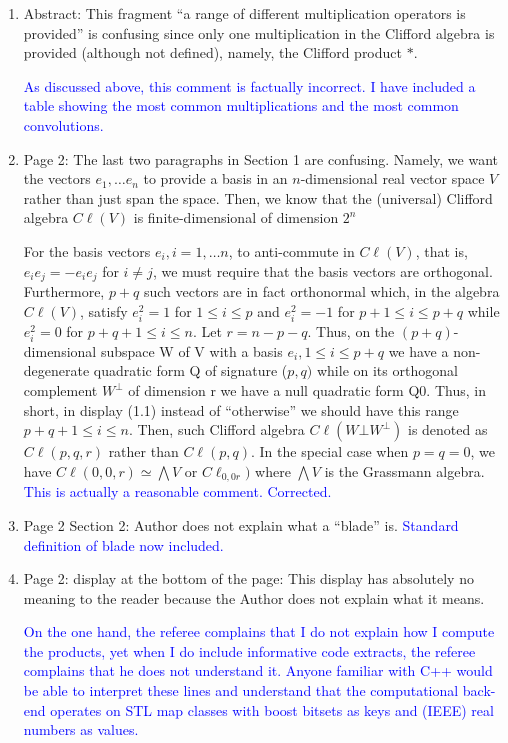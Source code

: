 \documentclass{article}
\newcommand{\cliff}[1]{\ensuremath{C\ell\left(#1\right)}}
\begin{document}
\begin{enumerate}
  \item Abstract: This fragment “a range of different multiplication operators is provided” is confusing since only one multiplication in the Clifford algebra is provided (although not defined),
    namely, the Clifford product $*$.

    \textcolor{blue}{As discussed above, this comment is factually
      incorrect. I have included a table showing the most common
      multiplications and the most common convolutions.    }

    
\item Page 2: The last two paragraphs in Section 1 are confusing.
  Namely, we want the vectors $e_1,\ldots e_n$ to provide a basis in
  an $n$-dimensional real vector space $V$ rather than just span the
  space.  Then, we know that the (universal) Clifford algebra
  \cliff{V} is finite-dimensional of dimension $2^n$

  For the basis vectors $e_i , i = 1, \ldots n$, to anti-commute in
  \cliff{V}, that is, $e_i e_j = -e_i e_j$ for $i\neq j$, we must
  require that the basis vectors are orthogonal.  Furthermore, $p + q$
  such vectors are in fact orthonormal which, in the algebra
  \cliff{V}, satisfy $e_i^2 = 1$ for $1\leq i\leq p$ and $e_i^2 = -1$
  for $p+1\leq i\leq p+q$ while $e_i^2 = 0$ for $p + q + 1 \leq i\leq
  n$.  Let $r=n-p-q$.  Thus, on the $(p + q)$-dimensional subspace W
  of V with a basis $e_i, 1\leq i \leq p+q$ we have a non-degenerate
  quadratic form Q of signature ($p, q)$ while on its orthogonal
  complement $W^\bot$ of dimension r we have a null quadratic form
  Q0. Thus, in short, in display (1.1) instead of “otherwise” we
  should have this range $p + q + 1 \leq i \leq n$.  Then, such
  Clifford algebra \cliff{W\bot W^\bot} is denoted as \cliff{p,q,r}
  rather than \cliff{p,q}. In the special case when $p = q = 0$, we
  have $\cliff{0,0,r}\simeq\bigwedge V$ or $C\ell_{0,0r})$ where
  $\bigwedge V$ is the Grassmann algebra.
  \textcolor{blue}{This is actually a reasonable comment.  Corrected.}
  
\item  Page 2 Section 2: Author does not
  explain what a “blade” is.
  \textcolor{blue}{Standard definition of blade now included.}
  \item Page 2: display at the bottom of the
page: This display has absolutely no meaning to the reader because the
Author does not explain what it means.

\textcolor{blue}{On the one hand, the referee complains that I do not
  explain how I compute the products, yet when I do include
  informative code extracts, the referee complains that he does not
  understand it.  Anyone familiar with C++ would be able to interpret
  these lines and understand that the computational back-end operates
  on STL map classes with boost bitsets as keys and (IEEE) real
  numbers as values.}


\end{enumerate}
\end{document}
